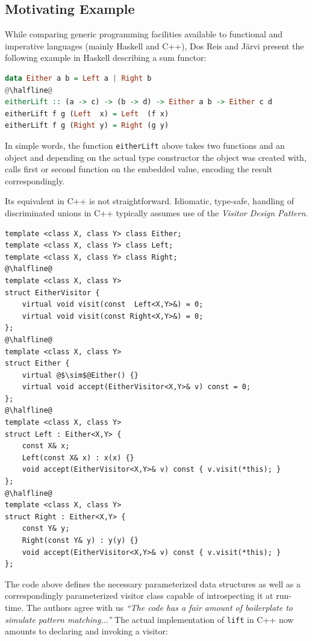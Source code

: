 \documentclass[preprint]{sigplanconf}
\DeclareRobustCommand{\codehaskell}[1]{{\lstinline[breaklines=false,language=Haskell]{#1}}}
\begin{document}
\subsection{Motivating Example}
\label{sec:xmpl}

While comparing generic programming facilities available to functional and 
imperative languages (mainly Haskell and C++), Dos Reis and J\"arvi present the 
following example in Haskell describing a sum functor\cite{DRJ05}:

\begin{lstlisting}[language=Haskell]
data Either a b = Left a | Right b
@\halfline@
eitherLift :: (a -> c) -> (b -> d) -> Either a b -> Either c d
eitherLift f g (Left  x) = Left  (f x)
eitherLift f g (Right y) = Right (g y)
\end{lstlisting}

\noindent
In simple words, the function \codehaskell{eitherLift} above takes two functions and an 
object and depending on the actual type constructor the object was created with, 
calls first or second function on the embedded value, encoding the result 
correspondingly.

Its equivalent in C++ is not straightforward. Idiomatic, type-safe, handling of 
discriminated unions in C++ typically assumes use of the \emph{Visitor Design 
Pattern}\cite{DesignPatterns1993}.

\begin{lstlisting}
template <class X, class Y> class Either;
template <class X, class Y> class Left;
template <class X, class Y> class Right;
@\halfline@
template <class X, class Y>
struct EitherVisitor {
    virtual void visit(const  Left<X,Y>&) = 0;
    virtual void visit(const Right<X,Y>&) = 0;
};
@\halfline@
template <class X, class Y>
struct Either {
    virtual @$\sim$@Either() {}
    virtual void accept(EitherVisitor<X,Y>& v) const = 0;
};
@\halfline@
template <class X, class Y>
struct Left : Either<X,Y> {
    const X& x;
    Left(const X& x) : x(x) {}
    void accept(EitherVisitor<X,Y>& v) const { v.visit(*this); }
};
@\halfline@
template <class X, class Y>
struct Right : Either<X,Y> {
    const Y& y;
    Right(const Y& y) : y(y) {}
    void accept(EitherVisitor<X,Y>& v) const { v.visit(*this); }
};
\end{lstlisting}

\noindent
The code above defines the necessary parameterized data structures as well as a 
correspondingly parameterized visitor class capable of introspecting it at 
run-time. The authors agree with us \emph{``The code has a fair amount of 
boilerplate to simulate pattern matching...''}\cite{DRJ05} The actual 
implementation of \codehaskell{lift} in C++ now amounts to declaring and 
invoking a visitor:
\end{document}
